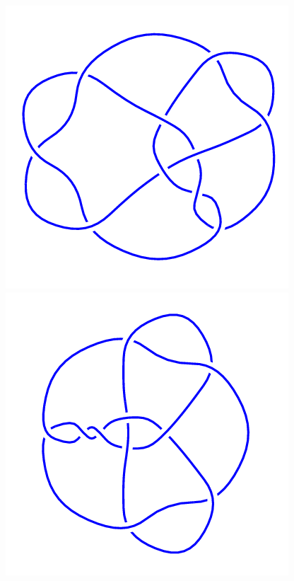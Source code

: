 \begin{figure}[H]
	\begin{minipage}[b]{.18\linewidth}
		\centering
		\includegraphics[width=\linewidth]{../data/10_102.png}
	\end{minipage}
	\begin{minipage}[b]{.18\linewidth}
		\centering
		\includegraphics[width=\linewidth]{../data/10_103.png}

\end{minipage}
\end{figure}
